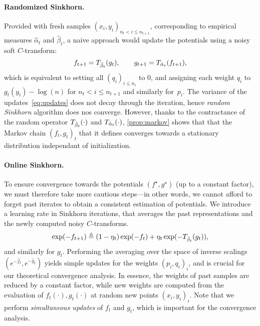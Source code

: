 \paragraph{Randomized Sinkhorn.}
Provided with fresh samples $(x_i, y_i)_{n_t < i \leq n_{t+1}}$, 
corresponding to empirical measures $\hat \alpha_t$ and $\hat \beta_t$, a naive approach would 
 update the potentials using a noisy soft $C$-transform:
\begin{equation}\label{eq:updates}
     f_{t+1} = \Ctrans{g_t}{\hat \beta_t},
    \qquad g_{t+1} = \Ctrans{f_{t+1}}{\hat \alpha_t},
\end{equation}
which is equivalent to setting all $(q_i)_{i \leq n_t}$ to $0$, and assigning each weight
 $q_i$ to $g_t(y_i) - \log(n)$ for $n_t < i \leq  n_{t+1}$ and similarly for~$p_i$.
%
The variance of the updates~\eqref{eq:updates} does not decay through the
iteration, hence \textit{random Sinkhorn} algorithm does nos converge.
However, thanks to the contractance of the random operator $\Ctrans{\cdot}{\hat
\beta_t}$ and $\Ctrans{\cdot}{\hat \alpha_t}$, \autoref{prop:markov} shows that
that the Markov chain ${(f_t, g_t)}_t$ that it defines converges towards a
stationary distribution independant of initialization.

\paragraph{Online Sinkhorn.}

To ensure convergence towards the potentials $(f^\star, g^\star)$ (up to a
constant factor), we must therefore take more cautious steps---in other words,
we cannot afford to forget past iterates to obtain a consistent estimation of
potentials. We introduce a learning rate in Sinkhorn iterations, that averages
the past representations and the newly computed noisy $C$-transforms.
\begin{equation}\label{eq:updates}
    \exp(-f_{t+1})
    \eqdef (1 - \eta_t) \exp(-f_t) 
    + \eta_t 
    \exp(-\Ctrans{g_t}{\hat \beta_t}),
\end{equation}
and similarly for $g_t$. Performing the averaging over the space of inverse
scalings $(e^{-\hat f_{t}},e^{-\hat g_{t}})$ yields simple updates for the
weights ${(p_i,q_i)}_i$, and is crucial for our theoretical convergence
analysis. In essence, the weights of past samples are reduced by a constant
factor, while new weights are computed from the evaluation of $f_t(\cdot),
g_t(\cdot)$ at random new points ${(x_i, y_i)}_i$. Note that we perform
\textit{simultaneous updates} of $f_t$ and $g_t$, which is important for the
convergence analysis.


